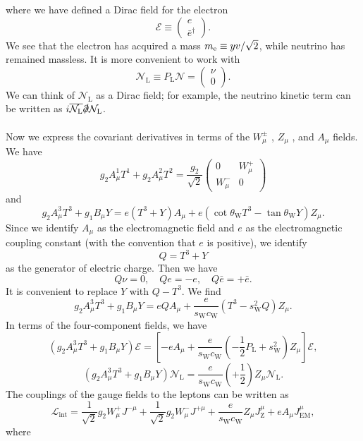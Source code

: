 where we have defined a Dirac field for the electron
\[\mathcal{E} \equiv \begin{pmatrix}
e \\ \bar{e}^{\dagger}
\end{pmatrix} .\]
We see that the electron has acquired a mass $m_{\rm e} \equiv {yv}/{\sqrt{2}}$, while neutrino has remained massless. It is more convenient to work with
\[\mathcal{N}_{\mathrm{L}} \equiv P_{\mathrm{L}} \mathcal{N} = \begin{pmatrix}
\nu \\ 0
\end{pmatrix}.\]
We can think of $\mathcal{N}_{\mathrm{L}}$ as a Dirac field; for example, the neutrino kinetic term can be written as $i\overline{\mathcal{N}_{\mathrm{L}}} \slashed{\partial} \mathcal{N}_{\mathrm{L}}$.
\\ \\
Now we express the covariant derivatives in terms of the $W_{\mu}^{\pm}$ , $Z_{\mu}$ , and $A_{\mu}$ fields. We have
\[g_2 A^1_{\mu}T^1 + g_2 A^2_{\mu}T^2 = \frac{g_2}{\sqrt{2}} \begin{pmatrix}
0 & W_{\mu}^+ \\ W^{-}_{\mu} & 0
\end{pmatrix} \]
and
\[g_2A^3_{\mu}T^3 + g_1 B_{\mu} Y = e(T^3+Y)A_{\mu} + e(\cot\theta_{\mathrm{W}} T^3 - \tan\theta_{\mathrm{W}} Y)Z_{\mu}.\]
Since we identify $A_{\mu}$ as the electromagnetic field and $e$ as the electromagnetic coupling constant (with the convention that $e$ is positive), we identify
\[Q = T^3 + Y\]
as the generator of electric charge. Then we have
\[Q\nu = 0 , \quad Qe = -e , \quad Q\bar{e} = +\bar{e}.\]
It is convenient to replace $Y$ with $Q - T^3$. We find
\[g_2A^3_{\mu}T^3 + g_1 B_{\mu} Y = eQA_{\mu} + \frac{e}{s_{\mathrm{W}} c_{\mathrm{W}}}( T^3 -  s_{\mathrm{W}}^2Q)Z_{\mu}.\]
In terms of the four-component fields, we have
\[(g_2A^3_{\mu}T^3 + g_1 B_{\mu} Y) \mathcal{E} = \left[-eA_{\mu} + \frac{e}{s_{\mathrm{W}} c_{\mathrm{W}}}( -\frac{1}{2}P_{\mathrm{L}} +  s_{\mathrm{W}}^2)Z_{\mu} \right] \mathcal{E},\]
\[(g_2A^3_{\mu}T^3 + g_1 B_{\mu} Y) \mathcal{N}_{\mathrm{L}} = \frac{e}{s_{\mathrm{W}} c_{\mathrm{W}}} (+\frac{1}{2}) Z_{\mu}\mathcal{N}_{\mathrm{L}} .\]
The couplings of the gauge fields to the leptons can be written as
\[\mathcal{L}_{\mathrm{int}} = \frac{1}{\sqrt{2}}g_2W_{\mu}^{+} J^{-\mu} + \frac{1}{\sqrt{2}}g_2W_{\mu}^{-} J^{+\mu} +  \frac{e}{s_{\mathrm{W}} c_{\mathrm{W}}} Z_{\mu}J_{\mathrm{Z}}^{\mu} + eA_{\mu}J^{\mu}_{\mathrm{EM}},\] 
where
